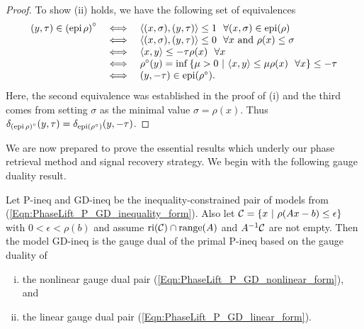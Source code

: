 \begin{proof}
To show (ii) holds, we have the following set of equivalences
\begin{equation*}
\begin{array}{rll}
(y, \tau) \in \left( \epi \halfspace \rho \right)^\circ
	&	\iff	&  \langle (x, \sigma), (y, \tau) \rangle \leq 1 \ \ \forall (x, \sigma) \in  \epi (\rho)
			\\
	&	\iff	&	 \langle (x, \sigma), (y, \tau) \rangle \leq 0 \ \ \forall x \text{ and } \rho(x) \leq \sigma
			\\
	&	\iff	&	\langle x, y \rangle \leq -\tau \rho(x) \ \ \forall x
			\\
	&	\iff	&	\rho^\circ(y) = \inf \left\{ \mu > 0 \ | \ \langle x, y \rangle \leq \mu \rho(x) \ \ \forall x \right\} \leq - \tau
			\\
		&	\iff	&	(y, -\tau)  \in \epi (\rho^\circ).
\end{array}
\end{equation*}
Here, the second equivalence was established in the proof of (i) and the third comes from setting $\sigma$ as the minimal value $\sigma = \rho(x)$.  Thus $\delta_{\left( \textnormal{epi} \hspace{0.05cm} \rho \right)^\circ} (y, \tau) = \delta_{\textnormal{epi} \left( \rho^\circ \right)}(y, -\tau)$.
\end{proof}





We are now prepared to prove the essential results which underly our phase retrieval method and signal recovery strategy.  We begin with the following gauge duality result.

\begin{theorem} 				\label{Thm:P-GD-inequality_pair_are_duals}
Let P-ineq and GD-ineq be the inequality-constrained pair of models from (\ref{Eqn:PhaseLift_P_GD_inequality_form}).  Also let ${\mathcal C} = \{ x \ | \ \rho(Ax-b) \leq \epsilon \}$ with $0 < \epsilon < \rho(b)$ and assume $\textnormal{ri}({\mathcal C}) \cap \textnormal{range}(A)$ and $A^{-1}{\mathcal C}$ are not empty.  Then the model GD-ineq is the gauge dual of the primal P-ineq based on the gauge duality of 
\begin{enumerate}[(i)]
\item
the nonlinear gauge dual pair (\ref{Eqn:PhaseLift_P_GD_nonlinear_form}), and
\item
the linear gauge dual pair (\ref{Eqn:PhaseLift_P_GD_linear_form}).
\end{enumerate}
\end{theorem}


